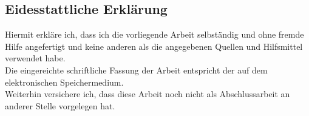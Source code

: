 
\begin{declaration}

\vfill
\subsection*{Eidesstattliche Erklärung}

Hiermit erkläre ich, dass ich die vorliegende Arbeit selbständig und
ohne fremde Hilfe angefertigt und
keine anderen als die angegebenen Quellen und Hilfsmittel verwendet habe.\\
Die eingereichte schriftliche Fassung der Arbeit entspricht der auf dem elektronischen Speichermedium.\\
Weiterhin versichere ich, dass diese Arbeit noch nicht als Abschlussarbeit an anderer Stelle vorgelegen hat.\\

\end{declaration}


